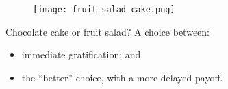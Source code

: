 \pause    
\begin{figure}[t]
    \centering
    \texttt{[image: fruit\_salad\_cake.png]}
\end{figure}
\pause
Chocolate cake or fruit salad? \pause  A choice between: 
\begin{itemize}
    \item immediate gratification; \pause and
    \item the ``better'' choice, with a more delayed payoff. 
\end{itemize}




